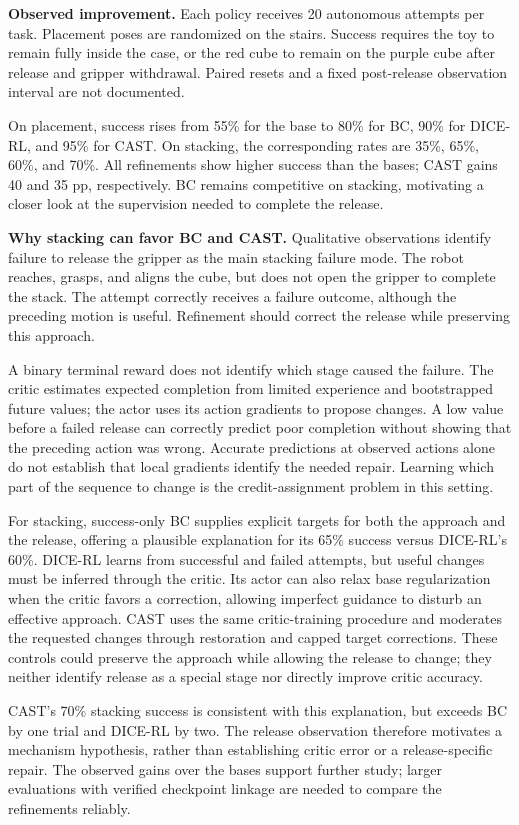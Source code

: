 \textbf{Observed improvement.}
Each policy receives 20 autonomous attempts per task. Placement poses are
randomized on the stairs. Success requires the toy to remain fully inside
the case, or the red cube to remain on the purple cube after release and
gripper withdrawal. Paired resets and a fixed post-release observation
interval are not documented.

On placement, success rises from 55\% for the base to 80\% for BC, 90\%
for DICE-RL, and 95\% for CAST. On stacking, the corresponding rates are
35\%, 65\%, 60\%, and 70\%. All refinements show higher success than
the bases; CAST gains 40 and 35 pp, respectively. BC remains competitive
on stacking, motivating a closer look at the supervision needed to
complete the release.

\textbf{Why stacking can favor BC and CAST.}
Qualitative observations identify failure to release the gripper as the
main stacking failure mode. The robot reaches, grasps, and aligns the
cube, but does not open the gripper to complete the stack. The attempt
correctly receives a failure outcome, although the preceding motion is
useful. Refinement should correct the release while preserving this approach.

A binary terminal reward does not identify which stage caused the failure.
The critic estimates expected completion from limited experience and
bootstrapped future values; the actor uses its action gradients to propose
changes. A low value before a failed release can correctly predict poor
completion without showing that the preceding action was wrong. Accurate
predictions at observed actions alone do not establish that local gradients
identify the needed repair. Learning which part of the sequence to change
is the credit-assignment problem in this setting.

For stacking, success-only BC supplies explicit targets for both the
approach and the release, offering a plausible explanation for its
65\% success versus DICE-RL's 60\%. DICE-RL learns from successful and
failed attempts, but useful changes must be inferred through the critic.
Its actor can also relax base regularization when the critic favors a
correction, allowing imperfect guidance to disturb an effective approach.
CAST uses the same critic-training procedure and moderates the requested
changes through restoration and capped target corrections. These controls
could preserve the approach while allowing the release to change; they
neither identify release as a special stage nor directly improve critic
accuracy.

CAST's 70\% stacking success is consistent with this explanation, but
exceeds BC by one trial and DICE-RL by two. The release observation
therefore motivates a mechanism hypothesis, rather than establishing
critic error or a release-specific repair. The observed gains over the
bases support further study; larger evaluations with verified checkpoint
linkage are needed to compare the refinements reliably.
